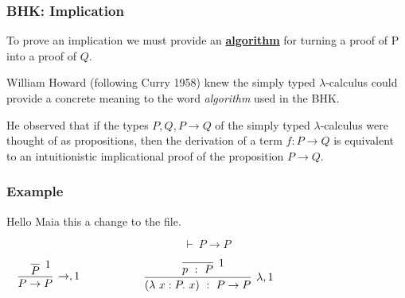 \documentclass{beamer}
\theoremstyle{indentDefn} \newtheorem{defn}[]{Definition}
\begin{document}
\begin{frame}
  \frametitle{BHK: Implication}

    To prove an implication we must provide an \underline{{\bf algorithm}} for turning a proof of P into a proof of $Q$.

    William Howard (following Curry 1958) knew the simply typed $\lambda$-calculus could provide a concrete meaning to the word \emph{algorithm} used in the BHK. 

    He observed that if the types $P,Q, P\to Q$ of the simply typed $\lambda$-calculus were thought of as propositions, then the derivation of a term $f : P \to Q$ is equivalent to an intuitionistic implicational proof of the proposition $P \to Q$. 
\end{frame}

\begin{frame}
  \frametitle{Example}

  Hello Maia this a change to the file.

  $$\vdash \ P \to P$$

  \vspace{1cm}

  \begin{center}
    $\begin{array}{l c r}
      
      \begin{array}{c}
        \infer[\to, 1]{P \to P}
          {\infer[1]{P}{}}
      \end{array}

      &
      \hspace{1cm}
      &
      
      \begin{array}{c}
        \infer[\lambda, 1]{(\lambda \ x : P. \ x) \ : \ P \to P}
          {\infer[1]{p \ : \ P}{}}
      \end{array}

    \end{array}$
  \end{center}

  \vspace{2.5cm}
\end{frame}
\end{document}
